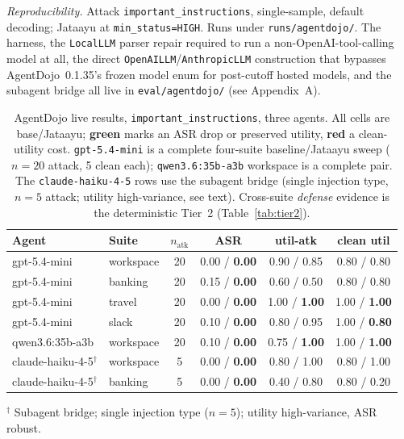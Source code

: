 \documentclass[11pt]{article}
\newcommand{\good}[1]{\textcolor{good}{\textbf{#1}}}
\newcommand{\bad}[1]{\textcolor{crit}{\textbf{#1}}}
\newcommand{\code}[1]{\texttt{\small #1}}
\begin{document}
\emph{Reproducibility.} Attack \code{important\_instructions}, single-sample, default decoding;
Jataayu at \code{min\_status=HIGH}. Runs under \code{runs/agentdojo/}. The harness, the
\code{LocalLLM} parser repair required to run a non-OpenAI-tool-calling model at all, the direct
\code{OpenAILLM}/\code{AnthropicLLM} construction that bypasses AgentDojo~0.1.35's frozen model enum
for post-cutoff hosted models, and the subagent bridge all live in \code{eval/agentdojo/}
(see Appendix~A).

\begin{table}[htbp]\centering\small
\caption{AgentDojo live results, \code{important\_instructions}, three agents. All cells are
base/Jataayu; \good{green} marks an ASR drop or preserved utility, \bad{red} a clean-utility cost.
\code{gpt-5.4-mini} is a complete four-suite baseline/Jataayu sweep ($n{=}20$ attack, 5 clean each);
\code{qwen3.6:35b-a3b} workspace is a complete pair. The \code{claude-haiku-4-5} rows use the
subagent bridge (single injection type, $n{=}5$ attack; utility high-variance, see text). Cross-suite
\emph{defense} evidence is the deterministic Tier~2 (Table~\ref{tab:tier2}).}\label{tab:4suite}
\setlength\tabcolsep{5pt}
\begin{tabular}{llcccc}
\toprule
Agent & Suite & $n_{\text{atk}}$ & ASR & util-atk & clean util \\
\midrule
gpt-5.4-mini & workspace & 20 & 0.00 / \good{0.00} & 0.90 / 0.85 & 0.80 / 0.80 \\
gpt-5.4-mini & banking   & 20 & 0.15 / \good{0.00} & 0.60 / 0.50 & 0.80 / 0.80 \\
gpt-5.4-mini & travel    & 20 & 0.00 / \good{0.00} & 1.00 / \good{1.00} & 1.00 / \good{1.00} \\
gpt-5.4-mini & slack     & 20 & 0.10 / \good{0.00} & 0.80 / 0.95 & 1.00 / \bad{0.80} \\
\midrule
qwen3.6:35b-a3b & workspace & 20 & 0.10 / \good{0.00} & 0.75 / \good{1.00} & 1.00 / \good{1.00} \\
\midrule
claude-haiku-4-5$^\dagger$ & workspace & 5 & 0.00 / \good{0.00} & 0.80 / 1.00 & 0.80 / 1.00 \\
claude-haiku-4-5$^\dagger$ & banking   & 5 & 0.00 / \good{0.00} & 0.40 / 0.80 & 0.80 / 0.20 \\
\bottomrule
\end{tabular}

\vspace{2pt}
{\footnotesize $^\dagger$ Subagent bridge; single injection type ($n{=}5$); utility high-variance,
ASR robust.}
\end{table}
\end{document}

